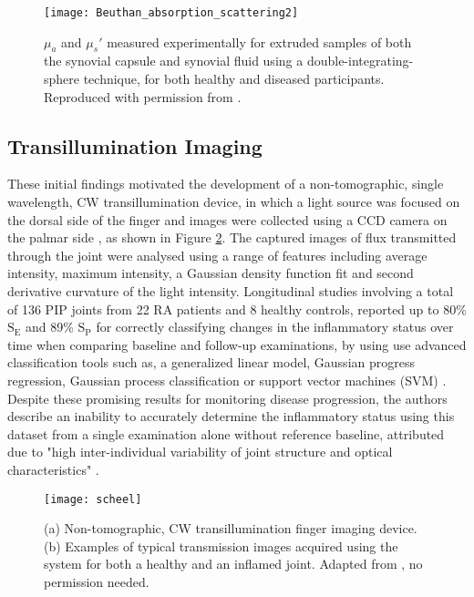 \documentclass[twoside]{bhamthesis}
\theoremstyle{definition}
\begin{document}
\begin{figure}[!ht]
\texttt{[image: Beuthan\_absorption\_scattering2]}
\centering
\caption{$\mu_a$ and $\mu_s'$ measured experimentally for extruded samples of both the synovial capsule and synovial fluid using a double-integrating-sphere technique, for both healthy and diseased participants. Reproduced with permission from \cite{beuthan2007ra}.}
\centering
\label{fig:Beuthan_absorption_scattering}
\end{figure} 

\subsection{Transillumination Imaging}
\label{Transillumination Imaging}

These initial findings motivated the development of a non-tomographic, single wavelength, CW transillumination device, in which a light source was focused on the dorsal side of the finger and images were collected using a CCD camera on the palmar side \cite{beuthan2002light,scheel2002assessment,schwaighofer2003ra,schwaighofer2003classification}, as shown in Figure \ref{fig:scheel_results}. 
The captured images of flux transmitted through the joint were analysed using a range of features including average intensity, maximum intensity, a Gaussian density function fit and second derivative curvature of the light intensity. Longitudinal studies involving a total of 136 PIP joints from 22 RA patients and 8 healthy controls, reported up to 80\% $\mathrm{S_E}$ and 89\% $\mathrm{S_P}$ for correctly classifying changes in the inflammatory status over time when comparing baseline and follow-up examinations, by using use advanced classification tools such as, a generalized linear model, Gaussian progress regression, Gaussian process classification or support vector machines (SVM) \cite{scheel2002assessment,schwaighofer2003classification}.
Despite these promising results for monitoring disease progression, the authors describe an inability to accurately determine the inflammatory status using this dataset from a single examination alone without reference baseline, attributed due to "high inter-individual variability of joint structure and optical characteristics" \cite{scheel2002assessment}.


\begin{figure}[!ht]
\texttt{[image: scheel]}
\centering
\caption{(a) Non-tomographic, CW transillumination finger imaging device. (b) Examples of typical transmission images acquired using the system for both a healthy and an inflamed joint. Adapted from \cite{schwaighofer2003classification}, no permission needed.}
\centering
\label{fig:scheel_results}
\end{figure} 
\end{document}
